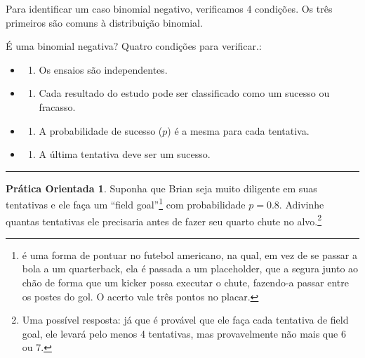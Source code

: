 \documentclass[
]{book}
\providecommand{\tightlist}{%
  \setlength{\itemsep}{0pt}\setlength{\parskip}{0pt}}
\theoremstyle{definition}
\theoremstyle{definition}
\theoremstyle{definition}
\newtheorem{exercise}{Prática Orientada}[chapter]
\theoremstyle{definition}
\theoremstyle{remark}
\begin{document}
Para identificar um caso binomial negativo, verificamos 4 condições. Os três primeiros são comuns à distribuição binomial.

É uma binomial negativa? Quatro condições para verificar.:

\begin{itemize}
\item
  \begin{enumerate}
  \def\labelenumi{(\arabic{enumi})}
  \tightlist
  \item
    Os ensaios são independentes.
  \end{enumerate}
\item
  \begin{enumerate}
  \def\labelenumi{(\arabic{enumi})}
  \setcounter{enumi}{1}
  \tightlist
  \item
    Cada resultado do estudo pode ser classificado como um sucesso ou fracasso.
  \end{enumerate}
\item
  \begin{enumerate}
  \def\labelenumi{(\arabic{enumi})}
  \setcounter{enumi}{2}
  \tightlist
  \item
    A probabilidade de sucesso (\(p\)) é a mesma para cada tentativa.
  \end{enumerate}
\item
  \begin{enumerate}
  \def\labelenumi{(\arabic{enumi})}
  \setcounter{enumi}{3}
  \tightlist
  \item
    A última tentativa deve ser um sucesso.
  \end{enumerate}
\end{itemize}

\begin{center}\rule{0.5\linewidth}{0.5pt}\end{center}

\begin{exercise}
\protect\hypertarget{exr:unnamed-chunk-142}{}{\label{exr:unnamed-chunk-142} }Suponha que Brian seja muito diligente em suas tentativas e ele faça um ``field goal''\footnote{ é uma forma de pontuar no futebol americano, na qual, em vez de se passar a bola a um quarterback, ela é passada a um placeholder, que a segura junto ao chão de forma que um kicker possa executar o chute, fazendo-a passar entre os postes do gol. O acerto vale três pontos no placar.} com probabilidade \(p=0.8\). Adivinhe quantas tentativas ele precisaria antes de fazer seu quarto chute no alvo.\footnote{Uma possível resposta: já que é provável que ele faça cada tentativa de field goal, ele levará pelo menos 4 tentativas, mas provavelmente não mais que 6 ou 7.}
\end{exercise}
\end{document}
